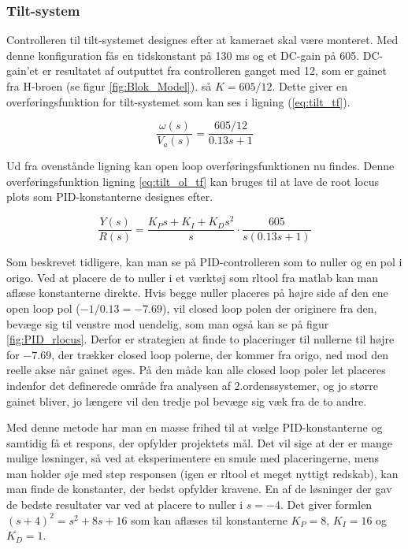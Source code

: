 \subsubsection{Tilt-system}

Controlleren til tilt-systemet designes efter at kameraet skal være monteret. Med denne konfiguration fås en tidskonstant på 130 ms og et DC-gain på 605. DC-gain'et er resultatet af outputtet fra controlleren ganget med 12, som er gainet fra H-broen (se figur \ref{fig:Blok_Model}). så $K=605/12$. Dette giver en overføringsfunktion for tilt-systemet som kan ses i ligning (\ref{eq:tilt_tf}). 

\begin{equation}\label{eq:tilt_tf}
\frac{\omega(s)}{V_{a}(s)}=\frac{605/12}{0.13s+1}
\end{equation}

Ud fra ovenstånde ligning kan open loop overføringsfunktionen nu findes. Denne overføringsfunktion ligning \eqref{eq:tilt_ol_tf} kan bruges til at lave de root locus plots som PID-konstanterne designes efter.

\begin{equation}\label{eq:tilt_ol_tf}
\frac{Y(s)}{R(s)}=\frac{K_{P}s+K_{I}+K_{D}s^2}{s}\cdot\frac{605}{s(0.13s+1)}
\end{equation}

Som beskrevet tidligere, kan man se på PID-controlleren som to nuller og en pol i origo. Ved at placere de to nuller i et værktøj som rltool fra matlab kan man aflæse konstanterne direkte. Hvis begge nuller placeres på højre side af den ene open loop pol ($-1/0.13=-7.69$), vil closed loop polen der originere fra den, bevæge sig til venstre mod uendelig, som man også kan se på figur \ref{fig:PID_rlocus}. Derfor er strategien at finde to placeringer til nullerne til højre for $-7.69$, der trækker closed loop polerne, der kommer fra origo, ned mod den reelle akse når gainet øges. På den måde kan alle closed loop poler let placeres indenfor det definerede område fra analysen af 2.ordenssystemer, og jo større gainet bliver, jo længere vil den tredje pol bevæge sig væk fra de to andre.

Med denne metode har man en masse frihed til at vælge PID-konstanterne og samtidig få et respons, der opfylder projektets mål. Det vil sige at der er mange mulige løsninger, så ved at eksperimentere en smule med placeringerne, mens man holder øje med step responsen (igen er rltool et meget nyttigt redskab), kan man finde de konstanter, der bedst opfylder kravene. En af de løsninger der gav de bedste resultater var ved at placere to nuller i $s=-4$. Det giver formlen $(s+4)^2=s^2+8s+16$ som kan aflæses til konstanterne $K_{P}=8$, $K_{I}=16$ og $K_{D}=1$. 

